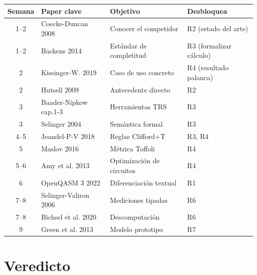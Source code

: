 \documentclass[12pt, a4paper]{article}
\begin{document}
\begin{center}
  \begin{tabular}{clll}
    \toprule
    \textbf{Semana} & \textbf{Paper clave}  & \textbf{Objetivo}         & \textbf{Desbloquea}     \\
    \midrule
    1--2            & Coecke-Duncan 2008    & Conocer el competidor     & R2 (estado del arte)    \\
    1--2            & Backens 2014          & Estándar de completitud   & R3 (formalizar cálculo) \\
    2               & Kissinger-W. 2019     & Caso de uso concreto      & R4 (resultado palanca)  \\
    2               & Hutsell 2009          & Antecedente directo       & R2                      \\
    3               & Baader-Nipkow cap.1-3 & Herramientas TRS          & R3                      \\
    3               & Selinger 2004         & Semántica formal          & R3                      \\
    4--5            & Jeandel-P-V 2018      & Reglas Clifford+T         & R3, R4                  \\
    5               & Maslov 2016           & Métrica Toffoli           & R4                      \\
    5--6            & Amy et al. 2013       & Optimización de circuitos & R4                      \\
    6               & OpenQASM 3 2022       & Diferenciación textual    & R1                      \\
    7--8            & Selinger-Valiron 2006 & Mediciones tipadas        & R6                      \\
    7--8            & Bichsel et al. 2020   & Descomputación            & R6                      \\
    9               & Green et al. 2013     & Modelo prototipo          & R7                      \\
    \bottomrule
  \end{tabular}
\end{center}

\section{Veredicto}
\end{document}
